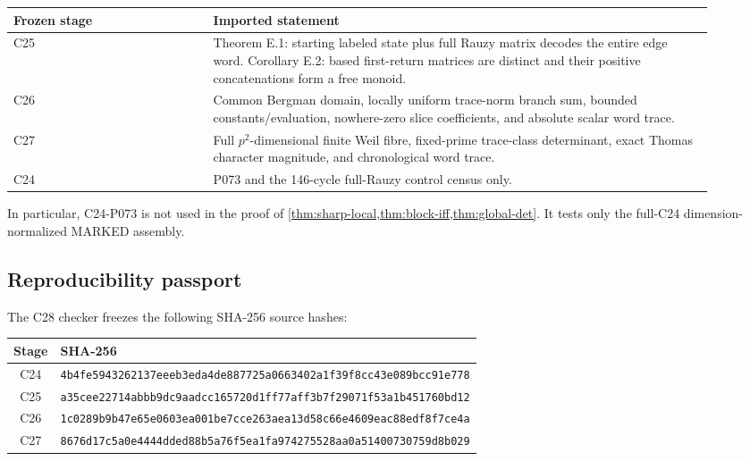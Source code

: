 \begin{center}
\begin{tabular}{@{}p{0.26\linewidth}p{0.65\linewidth}@{}}
\toprule
Frozen stage & Imported statement \\
\midrule
C25
& Theorem E.1: starting labeled state plus full Rauzy matrix decodes the
  entire edge word.  Corollary E.2: based first-return matrices are distinct
  and their positive concatenations form a free monoid. \\
C26
& Common Bergman domain, locally uniform trace-norm branch sum, bounded
  constants/evaluation, nowhere-zero slice coefficients, and absolute scalar
  word trace. \\
C27
& Full \(p^2\)-dimensional finite Weil fibre, fixed-prime trace-class
  determinant, exact Thomas character magnitude, and chronological word
  trace. \\
C24
& P073 and the 146-cycle full-Rauzy control census only. \\
\bottomrule
\end{tabular}
\end{center}

In particular, C24-P073 is not used in the proof of
\cref{thm:sharp-local,thm:block-iff,thm:global-det}.  It tests only the
full-C24 dimension-normalized MARKED assembly.

\subsection{Reproducibility passport}
\label{app:reproducibility}

The C28 checker freezes the following SHA-256 source hashes:

\begin{center}
\begin{tabular}{@{}cl@{}}
\toprule
Stage & SHA-256 \\
\midrule
C24 & \texttt{4b4fe5943262137eeeb3eda4de887725a0663402a1f39f8cc43e089bcc91e778} \\
C25 & \texttt{a35cee22714abbb9dc9aadcc165720d1ff77aff3b7f29071f53a1b451760bd12} \\
C26 & \texttt{1c0289b9b47e65e0603ea001be7cce263aea13d58c66e4609eac88edf8f7ce4a} \\
C27 & \texttt{8676d17c5a0e4444dded88b5a76f5ea1fa974275528aa0a51400730759d8b029} \\
\bottomrule
\end{tabular}
\end{center}

